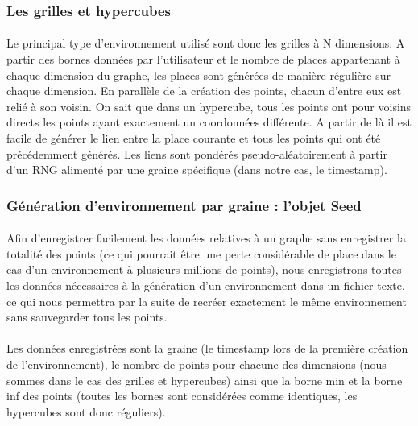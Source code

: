 \documentclass[pidr]{tnreport}
\begin{document}
			\subsubsection{Les grilles et hypercubes}
		
\paragraph{}
Le principal type d'environnement utilisé sont donc les grilles à N dimensions. A partir des bornes données par l'utilisateur et le nombre de places appartenant à chaque dimension du graphe, les places sont générées de manière régulière sur chaque dimension. En parallèle de la création des points, chacun d'entre eux est relié à son voisin. On sait que dans un hypercube, tous les points ont pour voisins directs les points ayant exactement un coordonnées différente. A partir de là il est facile de générer le lien entre la place courante et tous les points qui ont été précédemment générés. \newline
Les liens sont pondérés pseudo-aléatoirement à partir d'un RNG alimenté par une graine spécifique (dans notre cas, le timestamp).
		
			\subsubsection{Génération d'environnement par graine : l'objet Seed}

\paragraph{}
Afin d'enregistrer facilement les données relatives à un graphe sans enregistrer la totalité des points (ce qui pourrait être une  perte considérable de place dans le cas d'un environnement à plusieurs millions de points), nous enregistrons toutes les données nécessaires à la génération d'un environnement dans un fichier texte, ce qui nous permettra par la suite de recréer exactement le même environnement sans sauvegarder tous les points. 

\paragraph{}
Les données enregistrées sont la graine (le timestamp lors de la première création de l'environnement), le nombre de points pour chacune des dimensions (nous sommes dans le cas des grilles et hypercubes) ainsi que la borne min et la borne inf des points (toutes les bornes sont considérées comme identiques, les hypercubes sont donc réguliers).
\end{document}
